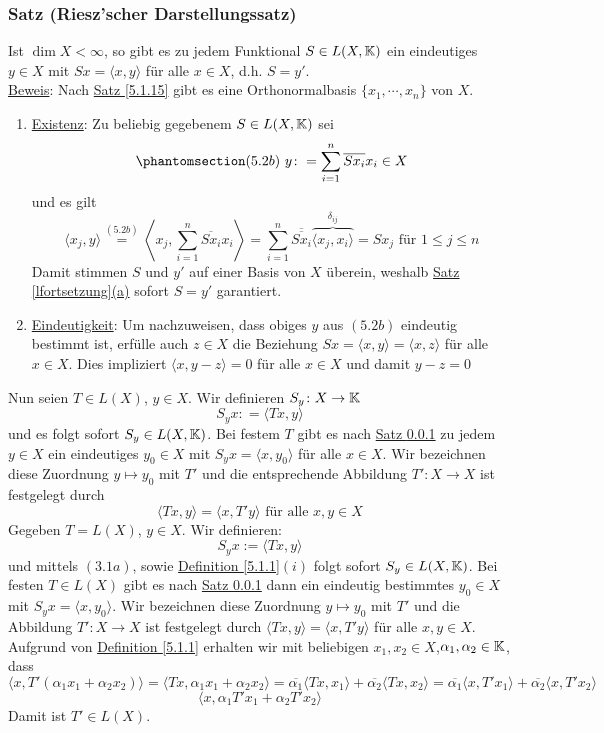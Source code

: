 \subsubsection{Satz (Riesz'scher Darstellungssatz)}
\label{5.2.1}
Ist $\dim X<\infty$, so gibt es zu jedem Funktional $S\in L(X,\mathbb{K})$ ein eindeutiges $y\in X$ mit $Sx=\langle x,y\rangle$ für alle $x\in X$, d.h. $S=y'$.\\
\underline{Beweis}: Nach \hyperref[5.1.15]{Satz \ref{5.1.15}} gibt es eine Orthonormalbasis $\{x_1,\cdots ,x_n\}$ von $X$.
\Romannum
\begin{enumerate}
\item \underline{Existenz}: Zu beliebig gegebenem $S\in L(X,\mathbb{K})$ sei
\[\phantomsection\label{5.2b}(5.2b)\ y\colon = \sum _{i=1}^n \overline{Sx_i}x_i\in X\]
und es gilt
\[\langle x_j,y\rangle \stackrel{\hyperref[5.2b]{(5.2b)}}{=} \left\langle x_j,\sum _{i=1}^n\overline{Sx_i}x_i\right\rangle =\sum _{i=1}^n \overline{\overline{Sx_i}}\overbrace{\langle x_j,x_i\rangle}^{\delta_{ij}}=Sx_j\text{ für }1\leq j\leq n\]
Damit stimmen $S$ und $y'$ auf einer Basis von $X$ überein, weshalb \hyperref[lfortsetzung]{Satz \ref{lfortsetzung}(a)} sofort $S=y'$ garantiert.
\item \underline{Eindeutigkeit}: Um nachzuweisen, dass obiges $y$ aus \hyperref[5.2b]{$(5.2b)$} eindeutig bestimmt ist, erfülle auch $z\in X$ die Beziehung $Sx=\langle x,y\rangle = \langle x,z\rangle $ für alle $x\in X$.  Dies impliziert $\langle x,y-z\rangle = 0$ für alle $x\in X$ und damit $y-z=0$
\end{enumerate}
Nun seien $T\in L(X)$, $y\in X$.  Wir definieren $S_y\colon X\rightarrow \mathbb{K}$
\[S_yx\colon =\langle Tx,y\rangle\]
und es folgt sofort $S_y\in L(X,\mathbb{K})$.  Bei festem $T$ gibt es nach \hyperref[5.2.1]{Satz \ref{5.2.1}} zu jedem $y\in X$ ein eindeutiges $y_0\in X$ mit $S_yx=\langle x,y_0\rangle$ für alle $x\in X$.  Wir bezeichnen diese Zuordnung $y\mapsto y_0$ mit $T'$ und die entsprechende Abbildung $T' \colon X\rightarrow X$ ist festgelegt durch
\[\langle Tx,y\rangle = \langle x,T' y\rangle\text{ für alle }x,y\in X\]
Gegeben $T=L(X)$, $y\in X$.  Wir definieren:
\[S_yx:=\langle Tx,y\rangle\]
und mittels \hyperref[3.1a]{$(3.1a)$}, sowie \hyperref[5.1.1]{Definition \ref{5.1.1}$(i)$} folgt sofort $S_y\in L(X,\mathbb{K})$.  Bei festen $T\in L(X)$ gibt es nach \hyperref[5.2.1]{Satz \ref{5.2.1}} dann ein eindeutig bestimmtes $y_0\in X$mit $S_yx=\langle x,y_0\rangle$.  Wir bezeichnen diese Zuordnung $y\mapsto y_0$ mit $T'$ und die Abbildung $T'\colon X\rightarrow X$ ist festgelegt durch $\langle Tx,y\rangle=\langle x,T'y\rangle$ für alle $x,y\in X$.  Aufgrund von \hyperref[5.1.1]{Definition \ref{5.1.1}} erhalten wir mit beliebigen $x_1,x_2\in X$,$\alpha _1,\alpha _2\in \mathbb{K}$, dass
\[\langle x,T'(\alpha _1x_1+\alpha _2x_2)\rangle =\langle Tx,\alpha _1x_1+\alpha _2x_2\rangle = \overline{\alpha _1}\langle Tx,x_1\rangle +\overline{\alpha _2}\langle Tx,x_2\rangle=\overline{\alpha _1}\langle x,T'x_1\rangle + \overline{\alpha _2}\langle x,T'x_2\rangle\]
\[\langle x,\alpha _1T'x_1+\alpha _2T'x_2\rangle\]
Damit ist $T'\in L(X)$.
